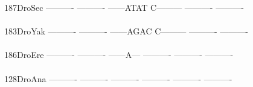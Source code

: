 \documentclass[11pt,twoside,reqno,a4paper]{article}
\begin{document}
{187\hspace*{2\charwidth}DroSec	----------	----------	------ATAT	C---------	----------	----------	\\
\hspace*{5\charwidth}\hspace*{7\charwidth}\hspace*{1\charwidth}\hspace*{1\charwidth}\hspace*{1\charwidth}\hspace*{1\charwidth}\hspace*{1\charwidth}\hspace*{1\charwidth}\\
183\hspace*{2\charwidth}DroYak	----------	----------	------AGAC	C---------	----------	----------	\\
\hspace*{5\charwidth}\hspace*{7\charwidth}\hspace*{1\charwidth}\hspace*{1\charwidth}\hspace*{1\charwidth}\hspace*{1\charwidth}\hspace*{1\charwidth}\hspace*{1\charwidth}\\
186\hspace*{2\charwidth}DroEre	----------	----------	------A---	----------	----------	----------	\\
\hspace*{5\charwidth}\hspace*{7\charwidth}\hspace*{1\charwidth}\hspace*{1\charwidth}\hspace*{1\charwidth}\hspace*{1\charwidth}\hspace*{1\charwidth}\hspace*{1\charwidth}\\
128\hspace*{2\charwidth}DroAna	----------	----------	----------	----------	----------	----------	\\
\hspace*{5\charwidth}\hspace*{7\charwidth}\hspace*{1\charwidth}\hspace*{1\charwidth}\hspace*{1\charwidth}\hspace*{1\charwidth}\hspace*{1\charwidth}\hspace*{1\charwidth}\\
}
\end{document}
